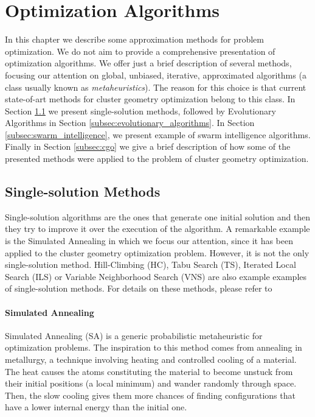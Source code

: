 \chapter{Optimization Algorithms}
	\label{chap:opt_alg}
		
	    In this chapter we describe some approximation methods for problem optimization. We do not aim to provide a comprehensive presentation of optimization algorithms. We offer just a brief description of several methods, focusing our attention on global, unbiased, iterative, approximated algorithms (a class usually known as \emph{metaheuristics}). The reason for this choice is that current state-of-art methods for cluster geometry optimization belong to this class. In Section \ref{subsec:single_state_solution} we present single-solution methods, followed by Evolutionary Algorithms in Section \ref{subsec:evolutionary_algorithms}. In Section \ref{subsec:swarm_intelligence}, we present example of swarm intelligence algorithms. Finally in Section \ref{subsec:cgo} we give a brief description of how some of the presented methods were applied to the problem of cluster geometry optimization. 
		\section{Single-solution Methods}
			\label{subsec:single_state_solution}
		 	Single-solution algorithms are the ones that generate one initial solution and then they try to improve it over the execution of the algorithm. A remarkable example is the Simulated Annealing in which we focus our attention, since it has been applied to the cluster geometry optimization problem. However, it is not the only single-solution method. Hill-Climbing (HC), Tabu Search (TS), Iterated Local Search (ILS) or Variable Neighborhood Search (VNS) are also example examples of single-solution methods. For details on these methods, please refer to \cite{luke09}  		
			
			\subsubsection*{Simulated Annealing}
			Simulated Annealing (SA) \cite{kirkpatrick83} is a generic probabilistic metaheuristic for optimization problems. The inspiration to this method comes from annealing in metallurgy, a technique involving heating and controlled cooling of a material. The heat causes the atoms constituting the material to become unstuck from their initial positions (a local minimum) and wander randomly through space. Then, the slow cooling gives them more chances of finding configurations that have a lower internal energy than the initial one.

